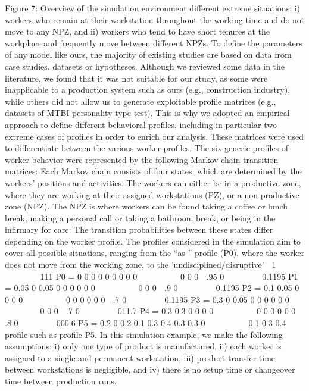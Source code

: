 Figure 7: Overview of the simulation environment
different extreme situations: i) workers who remain at their workstation throughout the working time and do not move to any NPZ, and ii) workers who tend to have short tenures at the workplace and frequently move between different NPZs. To define the parameters of any model like ours, the majority of existing studies are based on data from case studies, datasets or hypotheses. Although we reviewed some data in the literature, we found that it was not suitable for our study, as some were inapplicable to a production system such as ours (e.g., construction industry), while others did not allow us to generate exploitable profile matrices (e.g., datasets of MTBI personality type test). This is why we adopted an empirical approach to define different behavioral profiles, including in particular two extreme cases of profiles in order to enrich our analysis. These matrices were used to differentiate between the various worker profiles. The six generic profiles of worker behavior were represented by the following Markov chain transition matrices:
Each Markov chain consists of four states, which are determined by the workers’ positions and activities. The workers can either be in a productive zone, where they are working at their assigned workstations (PZ), or a non-productive zone (NPZ). The NPZ is where workers can be found taking a coffee or lunch break, making a personal call or taking a bathroom break, or being in the infirmary for care.
The transition probabilities between these states differ depending on the worker profile. The profiles considered in the simulation aim to cover all possible situations, ranging from the “as-” profile (P0), where the worker does not move from the working zone, to the ’undisciplined/disruptive’
 1  111
P0 =	0	0
0	0
0	0
0	0	0  
0
0
0	 .95
0  0.1195
P1 =	0.05	0
0.05	0
	0	0
	0	0	0  
0
0
0
		.9
0  0.1195
P2 =	0.1
0.05
0
0	0	0  
0	0 0	0
0	0			.7
0  0.1195
P3 =		0.3	0
0.05	0
	0	0
	0	0	0  
0
0
0
 .7
0  011.7
P4 =	0.3
0.3
0
0	0	0  
0	0 0	0
0	0	 .8
0  000.6
P5 =	0.2	0
0.2	0.1
0.3	0.4
0.3	0.3	0	 
0.1 0.3
0.4
profile such as profile P5. In this simulation example, we make the following assumptions: i) only one type of product is manufactured, ii) each worker is assigned to a single and permanent workstation, iii) product transfer time between workstations is negligible, and iv) there is no setup time or changeover time between production runs.
